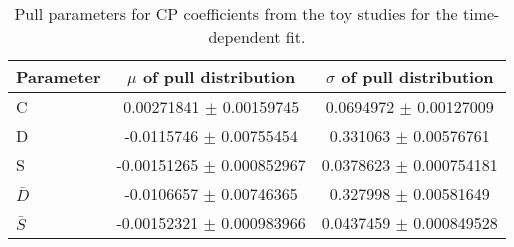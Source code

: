 \begin{table}[hp!]
\centering
\caption{Pull parameters for CP coefficients from the toy studies for the time-dependent fit.}
\begin{tabular}{l | c | c}
\hline
Parameter & $\mu$ of pull distribution & $\sigma$ of pull distribution \\
\hline
\hline
C & 0.00271841 $\pm$ 0.00159745 & 0.0694972 $\pm$ 0.00127009 \\
D & -0.0115746 $\pm$ 0.00755454 & 0.331063 $\pm$ 0.00576761 \\
S & -0.00151265 $\pm$ 0.000852967 & 0.0378623 $\pm$ 0.000754181 \\
$\bar{D}$ & -0.0106657 $\pm$ 0.00746365 & 0.327998 $\pm$ 0.00581649 \\
$\bar{S}$ & -0.00152321 $\pm$ 0.000983966 & 0.0437459 $\pm$ 0.000849528 \\
\hline
\end{tabular}
\label{table:Pulls_tDFit_noChol}
\end{table}
